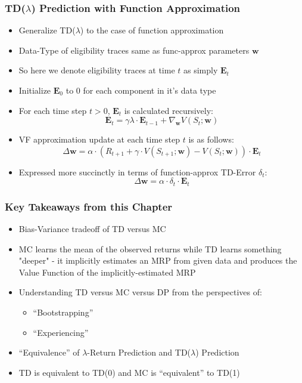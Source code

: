 \documentclass[handout]{beamer}
\begin{document}
\begin{frame}
\frametitle{TD($\lambda$) Prediction with Function Approximation}
\pause
\begin{itemize}[<+->]
\item Generalize TD($\lambda$) to the case of function approximation
\item Data-Type of eligibility traces same as func-approx parameters $\bm{w}$
\item So here we denote eligibility traces at time $t$ as simply $\bm{E}_t$
\item Initialize $\bm{E}_0$ to 0 for each component in it's data type
\item For each time step $t > 0$, $\bm{E}_t$ is calculated recursively:
$$\bm{E}_t = \gamma \lambda \cdot \bm{E}_{t-1} + \nabla_{\bm{w}} V(S_t;\bm{w})$$
\item VF approximation update at each time step $t$ is as follows:
$$\Delta \bm{w} = \alpha \cdot (R_{t+1} + \gamma \cdot V(S_{t+1}; \bm{w}) - V(S_t; \bm{w})) \cdot \bm{E}_t$$
\item Expressed more succinctly in terms of function-approx TD-Error $\delta_t$:
$$\Delta \bm{w} = \alpha \cdot \delta_t \cdot \bm{E}_t$$
\end{itemize}
\end{frame}


\begin{frame}
\frametitle{Key Takeaways from this Chapter}
\pause
\begin{itemize}[<+->]
\item Bias-Variance tradeoff of TD versus MC
\item MC learns the mean of the observed returns while TD learns something "deeper" - it implicitly estimates an MRP from given data and produces the Value Function of the implicitly-estimated MRP
\item Understanding TD versus MC versus DP from the perspectives of:
\begin{itemize}[<+->]
\item ``Bootstrapping''
\item ``Experiencing''
\end{itemize}
\item ``Equivalence'' of $\lambda$-Return Prediction and TD($\lambda$) Prediction
\item TD is equivalent to TD(0) and MC is ``equivalent'' to TD(1)
\end{itemize}
\end{frame}
\end{document}
